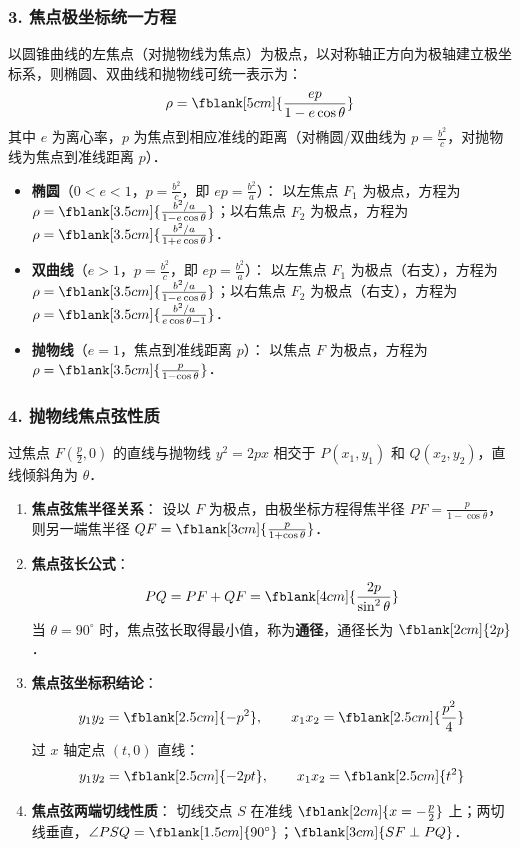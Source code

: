 \documentclass[11pt,a4paper]{ctexart}
\begin{document}
\subsubsection*{3. 焦点极坐标统一方程}
以圆锥曲线的左焦点（对抛物线为焦点）为极点，以对称轴正方向为极轴建立极坐标系，则椭圆、双曲线和抛物线可统一表示为：
\[ \rho = \fblank[5cm]{\frac{ep}{1-e\cos\theta}} \]
其中 $e$ 为离心率，$p$ 为焦点到相应准线的距离（对椭圆/双曲线为 $p = \frac{b^2}{c}$，对抛物线为焦点到准线距离 $p$）．
\begin{itemize}[itemsep=0.3em]
  \item \textbf{椭圆}（$0<e<1$，$p = \frac{b^2}{c}$，即 $ep = \frac{b^2}{a}$）：
        以左焦点 $F_1$ 为极点，方程为 $\rho = \fblank[3.5cm]{\frac{b^2/a}{1-e\cos\theta}}$；以右焦点 $F_2$ 为极点，方程为 $\rho = \fblank[3.5cm]{\frac{b^2/a}{1+e\cos\theta}}$．
  \item \textbf{双曲线}（$e>1$，$p = \frac{b^2}{c}$，即 $ep = \frac{b^2}{a}$）：
        以左焦点 $F_1$ 为极点（右支），方程为 $\rho = \fblank[3.5cm]{\frac{b^2/a}{1-e\cos\theta}}$；以右焦点 $F_2$ 为极点（右支），方程为 $\rho = \fblank[3.5cm]{\frac{b^2/a}{e\cos\theta-1}}$．
  \item \textbf{抛物线}（$e=1$，焦点到准线距离 $p$）：
        以焦点 $F$ 为极点，方程为 $\rho = \fblank[3.5cm]{\frac{p}{1-\cos\theta}}$．
\end{itemize}

\subsubsection*{4. 抛物线焦点弦性质}
过焦点 $F(\frac{p}{2},0)$ 的直线与抛物线 $y^2 = 2px$ 相交于 $P(x_1, y_1)$ 和 $Q(x_2, y_2)$，直线倾斜角为 $\theta$．
\begin{enumerate}[label=\arabic*.]
  \item \textbf{焦点弦焦半径关系}：
        设以 $F$ 为极点，由极坐标方程得焦半径 $PF = \frac{p}{1-\cos\theta}$，则另一端焦半径 $QF = \fblank[3cm]{\frac{p}{1+\cos\theta}}$．
  \item \textbf{焦点弦长公式}：
        \[ PQ = PF + QF = \fblank[4cm]{\frac{2p}{\sin^2\theta}} \]
        当 $\theta = 90^\circ$ 时，焦点弦长取得最小值，称为\textbf{通径}，通径长为 $\fblank[2cm]{2p}$．
  \item \textbf{焦点弦坐标积结论}：
        \[ y_1y_2 = \fblank[2.5cm]{-p^2},\qquad x_1x_2 = \fblank[2.5cm]{\frac{p^2}{4}} \]
        过 $x$ 轴定点 $(t,0)$ 直线：
        \[ y_1y_2 = \fblank[2.5cm]{-2pt},\qquad x_1x_2 = \fblank[2.5cm]{t^2} \]
  \item \textbf{焦点弦两端切线性质}：
        切线交点 $S$ 在准线 $\fblank[2cm]{x = -\frac{p}{2}}$ 上；两切线垂直，$\angle PSQ = \fblank[1.5cm]{90^\circ}$；$\fblank[3cm]{SF \perp PQ}$．
\end{enumerate}
\end{document}
